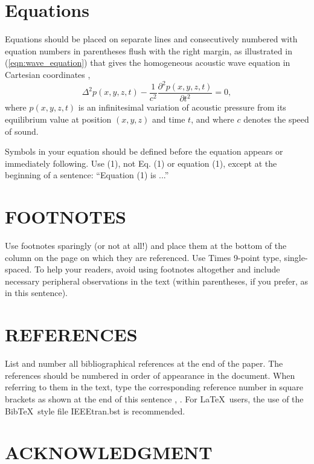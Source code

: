 \documentclass{article}
\begin{document}
\begin{sloppy}
\section{Equations}
\label{sec:equations}

Equations should be placed on separate lines and consecutively
numbered with equation numbers in parentheses flush with the 
right margin, as illustrated in (\ref{eqn:wave_equation}) 
that gives the homogeneous acoustic wave equation in
Cartesian coordinates \cite{eWilliams1999},
\begin{equation}
  \label{eqn:wave_equation}
    \Delta^2p(x,y,z,t)-
    \displaystyle\frac{1}{c^2}\frac{\partial^2p(x,y,z,t)}{\partial t^2}=0,
\end{equation}
where $p(x,y,z,t)$ is an infinitesimal variation of acoustic 
pressure from its equilibrium value at position $(x,y,z)$ and 
time $t$, and where $c$ denotes the speed of sound.

Symbols in your equation should be defined before the equation 
appears or immediately following.  Use (1), not Eq. (1) or 
equation (1), except at the beginning of a sentence:  
``Equation (1) is ...''



\section{FOOTNOTES}
\label{sec:foot}

Use footnotes sparingly (or not at all!) and place them at 
the bottom of the column on the page on which they are 
referenced. Use Times 9-point type, single-spaced. To 
help your readers, avoid using footnotes altogether and
include necessary peripheral observations in the text 
(within parentheses, if you prefer, as in this sentence).


\section{REFERENCES}
\label{sec:ref}

List and number all bibliographical references at the end 
of the paper. The references should be numbered in order 
of appearance in the document. When referring to them in 
the text, type the corresponding reference number in 
square brackets as shown at the end of this sentence 
\cite{cJones2003}, \cite{aSmith2000}. For \LaTeX\ users, 
the use of the Bib\TeX\ style file IEEEtran.bst is 
recommended.

\section{ACKNOWLEDGMENT}
\label{sec:ack}


\end{sloppy}
\end{document}

